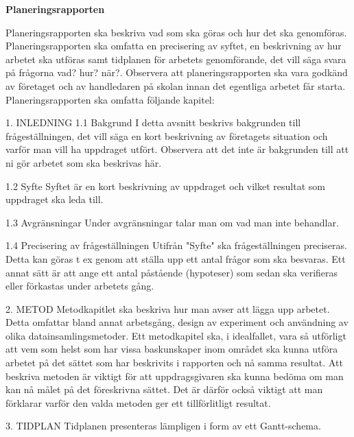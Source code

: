 \documentclass[12pt,a4paper,twoside,openright]{report}
\begin{document}
 
\textbf{Planeringsrapporten}

Planeringsrapporten ska beskriva vad som ska göras och hur det ska genomföras. Planeringsrapporten ska omfatta en precisering av syftet, en beskrivning av hur arbetet ska utföras samt tidplanen för arbetets genomförande, det vill säga svara på frågorna vad? hur? när?.
Observera att planeringsrapporten ska vara godkänd av företaget och av handledaren på skolan innan det egentliga arbetet får starta. Planeringsrapporten ska omfatta följande kapitel:

1. INLEDNING
1.1 Bakgrund
I detta avsnitt beskrivs bakgrunden till frågeställningen, det vill säga en kort beskrivning av företagets situation och varför man vill ha uppdraget utfört. Observera att det inte är bakgrunden till att ni gör arbetet som ska beskrivas här.

1.2 Syfte
Syftet är en kort beskrivning av uppdraget och vilket resultat som uppdraget ska leda till.

1.3 Avgränsningar
Under avgränsningar talar man om vad man inte behandlar.

1.4 Precisering av frågeställningen
Utifrån "Syfte" ska frågeställningen preciseras. Detta kan göras t ex genom att ställa upp ett antal frågor som ska besvaras. Ett annat sätt är att ange ett antal påstående (hypoteser) som sedan ska verifieras eller förkastas under arbetets gång.

2. METOD
Metodkapitlet ska beskriva hur man avser att lägga upp arbetet. Detta omfattar bland annat arbetsgång, design av experiment och användning av olika datainsamlingsmetoder. Ett metodkapitel ska, i idealfallet, vara så utförligt att vem som helst som har vissa baskunskaper inom området ska kunna utföra arbetet på det sättet som har beskrivits i rapporten och nå samma resultat. Att beskriva metoden är viktigt för att uppdragsgivaren ska kunna bedöma om man kan nå målet på det föreskrivna sättet. Det är därför också viktigt att man förklarar varför den valda metoden ger ett tillförlitligt resultat.

3. TIDPLAN
Tidplanen presenteras lämpligen i form av ett Gantt-schema.
\end{document}
